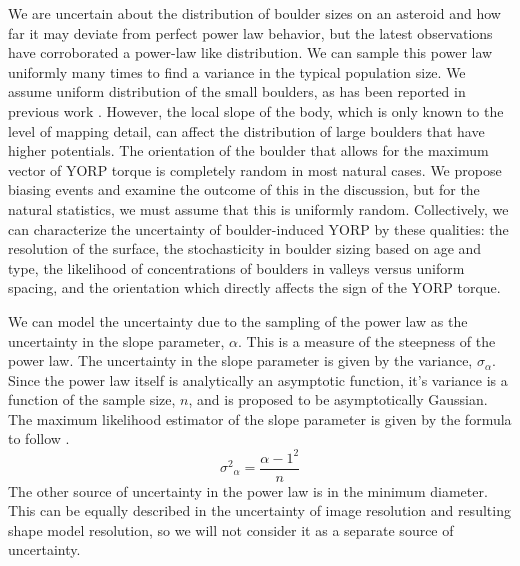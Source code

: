 We are uncertain about the distribution of boulder sizes on an asteroid and how far it may deviate from perfect power law behavior, but the latest observations have corroborated a power-law like distribution. We can sample this power law uniformly many times to find a variance in the typical population size. We assume uniform distribution of the small boulders, as has been reported in previous work \cite{DellaGiustina2019}. However, the local slope of the body, which is only known to the level of mapping detail, can affect the distribution of large boulders that have higher potentials. The orientation of the boulder that allows for the maximum vector of YORP torque is completely random in most natural cases. We propose biasing events and examine the outcome of this in the discussion, but for the natural statistics, we must assume that this is uniformly random. Collectively, we can characterize the uncertainty of boulder-induced YORP by these qualities: the resolution of the surface, the stochasticity in boulder sizing based on age and type, the likelihood of concentrations of boulders in valleys versus uniform spacing, and the orientation which directly affects the sign of the YORP torque. 

We can model the uncertainty due to the sampling of the power law as the uncertainty in the slope parameter, $\alpha$. This is a measure of the steepness of the power law. The uncertainty in the slope parameter is given by the variance, $\sigma_{\alpha}$. Since the power law itself is analytically an asymptotic function, it's variance is a function of the sample size, $n$, and is proposed to be asymptotically Gaussian. The maximum likelihood estimator of the slope parameter is given by the formula to follow \cite{Clauset2009}.  
\begin{equation}
    {\sigma^2}_{\alpha} = \frac{{\alpha-1}^2}{n}
\end{equation}
The other source of uncertainty in the power law is in the minimum diameter. This can be equally described in the uncertainty of image resolution and resulting shape model resolution, so we will not consider it as a separate source of uncertainty.

